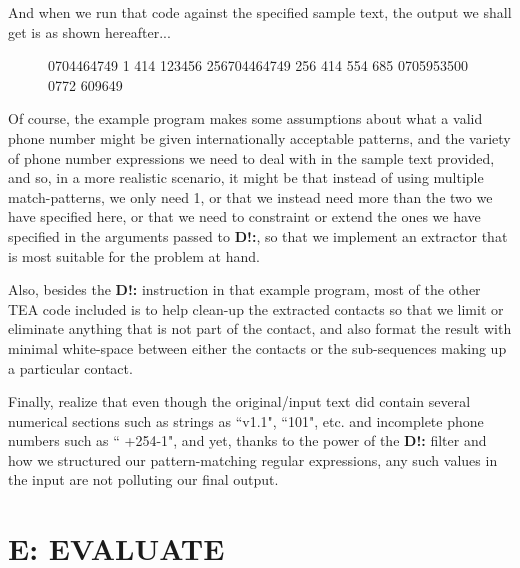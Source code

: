 \documentclass[a4paper, 18pt]{book} %
\begin{document}
And when we run that code against the specified sample text, the output we shall get is as shown hereafter...


\begin{figure}[H]
  \centering
  \begin{tcolorbox}[title=Sample EXTRACTED Output Text Containing Phone Contacts,  breakable,listing options={basicstyle=\ttfamily, breaklines=true, breakatwhitespace=true}]
0704464749 1 414 123456 256704464749 256 414 554 685 0705953500 0772 609649
  \end{tcolorbox}
\end{figure}

Of course, the example program makes some assumptions about what a valid phone number might be given internationally acceptable patterns, and the variety of phone number expressions we need to deal with in the sample text provided, and so, in a more realistic scenario, it might be that instead of using multiple match-patterns, we only need 1, or that we instead need more than the two we have specified here, or that we need to constraint or extend the ones we have specified in the arguments passed to \textbf{D!:}, so that we implement an extractor that is most suitable for the problem at hand.

\vspace{1em}


Also, besides the \textbf{D!:} instruction in that example program, most of the other TEA code included is to help clean-up the extracted contacts so that we limit or eliminate anything that is not part of the contact, and also format the result with minimal white-space between either the contacts or the sub-sequences making up a particular contact.

\vspace{1em}

Finally, realize that even though the original/input text did contain several numerical sections such as strings as ``v1.1", ``101", etc. and incomplete phone numbers such as `` +254-1", and yet, thanks to the power of the \textbf{D!:} filter and how we structured our pattern-matching regular expressions, any such values in the input are not polluting our final output.



 
\chapter{E: EVALUATE}
\label{CHAPE}
\end{document}
